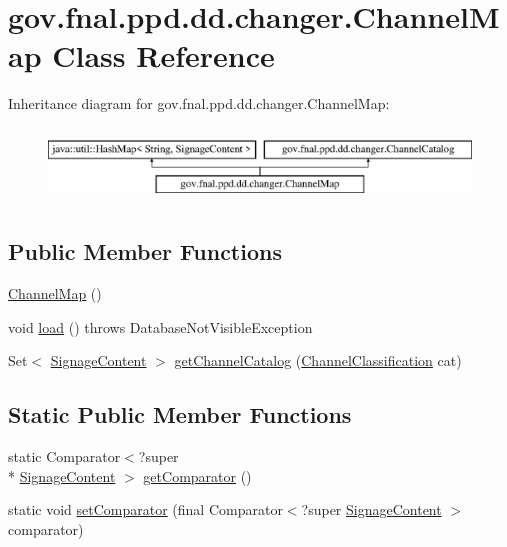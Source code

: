 \hypertarget{classgov_1_1fnal_1_1ppd_1_1dd_1_1changer_1_1ChannelMap}{\section{gov.\-fnal.\-ppd.\-dd.\-changer.\-Channel\-Map Class Reference}
\label{classgov_1_1fnal_1_1ppd_1_1dd_1_1changer_1_1ChannelMap}
}
Inheritance diagram for gov.\-fnal.\-ppd.\-dd.\-changer.\-Channel\-Map\-:\begin{figure}[H]
\begin{center}
\leavevmode
\includegraphics[height=1.992882cm]{classgov_1_1fnal_1_1ppd_1_1dd_1_1changer_1_1ChannelMap}
\end{center}
\end{figure}
\subsection*{Public Member Functions}
\begin{DoxyCompactItemize}
\item 
\hyperlink{classgov_1_1fnal_1_1ppd_1_1dd_1_1changer_1_1ChannelMap_ab99d1e19f2fd846231138f6df6180887}{Channel\-Map} ()
\item 
void \hyperlink{classgov_1_1fnal_1_1ppd_1_1dd_1_1changer_1_1ChannelMap_a30c699e2eb86a310daa014e974c29bac}{load} ()  throws Database\-Not\-Visible\-Exception 
\item 
Set$<$ \hyperlink{interfacegov_1_1fnal_1_1ppd_1_1dd_1_1signage_1_1SignageContent}{Signage\-Content} $>$ \hyperlink{classgov_1_1fnal_1_1ppd_1_1dd_1_1changer_1_1ChannelMap_a34cad0dedd9b3ed3418a405d0c85ed27}{get\-Channel\-Catalog} (\hyperlink{classgov_1_1fnal_1_1ppd_1_1dd_1_1changer_1_1ChannelClassification}{Channel\-Classification} cat)
\end{DoxyCompactItemize}
\subsection*{Static Public Member Functions}
\begin{DoxyCompactItemize}
\item 
static Comparator$<$?super \\*
\hyperlink{interfacegov_1_1fnal_1_1ppd_1_1dd_1_1signage_1_1SignageContent}{Signage\-Content} $>$ \hyperlink{classgov_1_1fnal_1_1ppd_1_1dd_1_1changer_1_1ChannelMap_a84bd80c4a6675118fd137cc9258b7ebc}{get\-Comparator} ()
\item 
static void \hyperlink{classgov_1_1fnal_1_1ppd_1_1dd_1_1changer_1_1ChannelMap_a0b5890b5e7eaf8d8ffdb38bb6b4fae64}{set\-Comparator} (final Comparator$<$?super \hyperlink{interfacegov_1_1fnal_1_1ppd_1_1dd_1_1signage_1_1SignageContent}{Signage\-Content} $>$ comparator)
\end{DoxyCompactItemize}


